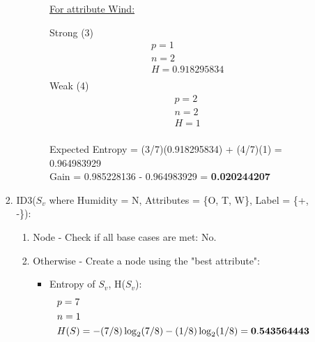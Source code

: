 \documentclass[8pt, fullpage,letterpaper]{article}
\begin{document}
\begin{enumerate}
\begin{enumerate}
\begin{enumerate}
\begin{enumerate}
\begin{itemize}
						\underline {For attribute Wind:} 
							\vspace{-5pt}
							\begin{multicols}{2}
								Strong (3)
			 						\begin{align*}
									    	& p = 1\\
										& n = 2 \\
									    	& H = 0.918295834\\
								      \end{align*}
								Weak (4)
			 						\begin{align*}
									    	& p = 2\\
										& n = 2 \\
									    	& H = 1\\
								      \end{align*}
							\end{multicols}
							\vspace{-20pt}
							Expected Entropy = (3/7)(0.918295834) + (4/7)(1) = 0.964983929\\
							Gain = 0.985228136 - 0.964983929 = {\bf 0.020244207}\\

					\centerline{}	
				\end{itemize}	
			\end{enumerate}


	 	\item ID3($S_v$ where Humidity = N, Attributes = \{O, T, W\}, Label = \{+, -\}): 
			\begin{enumerate}
			\item Node - Check if all base cases are met: {\color{red} No}.	
			\item Otherwise - Create a node using the "best attribute":
				\begin{itemize}
					\item Entropy of $S_v$, H($S_v$):
						\begin{align*}
						    	& p = 7\\
							& n = 1 \\
						    	& H(S) = - (7/8) \log_2 (7/8) - (1/8) \log_2 (1/8) = {\bf 0.543564443}
					      \end{align*}


\end{itemize}
\end{enumerate}
\end{enumerate}
\end{enumerate}
\end{enumerate}
\end{document}
